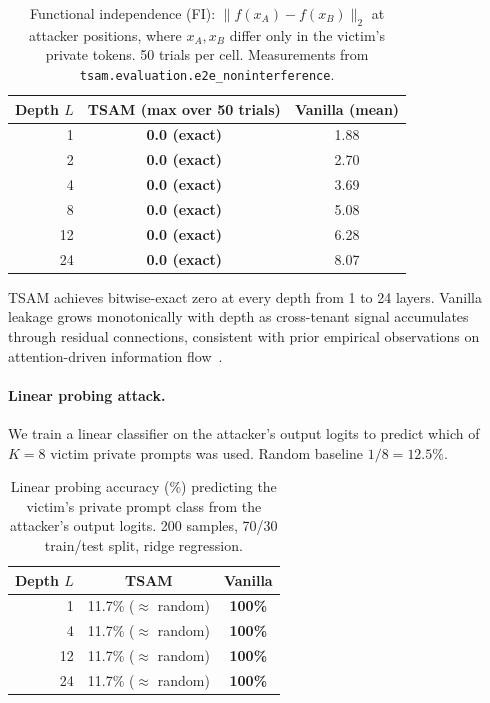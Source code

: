 \documentclass[11pt]{article}
\begin{document}
\begin{table}[h]
\centering
\caption{Functional independence (FI): $\|f(x_A) - f(x_B)\|_2$ at attacker
positions, where $x_A, x_B$ differ only in the victim's private tokens.
50 trials per cell.  Measurements from
\texttt{tsam.evaluation.e2e\_noninterference}.}
\label{tab:fi}
\begin{tabular}{rcc}
\toprule
Depth $L$ & TSAM (max over 50 trials) & Vanilla (mean) \\
\midrule
1  & \textbf{0.0 (exact)} & 1.88 \\
2  & \textbf{0.0 (exact)} & 2.70 \\
4  & \textbf{0.0 (exact)} & 3.69 \\
8  & \textbf{0.0 (exact)} & 5.08 \\
12 & \textbf{0.0 (exact)} & 6.28 \\
24 & \textbf{0.0 (exact)} & 8.07 \\
\bottomrule
\end{tabular}
\end{table}

TSAM achieves bitwise-exact zero at every depth from 1 to 24 layers.
Vanilla leakage grows monotonically with depth as cross-tenant signal
accumulates through residual connections, consistent with prior empirical
observations on attention-driven information flow~\citep{carlini2021extracting,
nasr2023scalable}.

\paragraph{Linear probing attack.}
We train a linear classifier on the attacker's output logits to predict
which of $K = 8$ victim private prompts was used.  Random baseline
$1/8 = 12.5\%$.

\begin{table}[h]
\centering
\caption{Linear probing accuracy (\%) predicting the victim's private prompt
class from the attacker's output logits.  200 samples, 70/30 train/test
split, ridge regression.}
\label{tab:probe}
\begin{tabular}{rcc}
\toprule
Depth $L$ & TSAM & Vanilla \\
\midrule
1  & 11.7\% ($\approx$ random) & \textbf{100\%} \\
4  & 11.7\% ($\approx$ random) & \textbf{100\%} \\
12 & 11.7\% ($\approx$ random) & \textbf{100\%} \\
24 & 11.7\% ($\approx$ random) & \textbf{100\%} \\
\bottomrule
\end{tabular}
\end{table}
\end{document}
